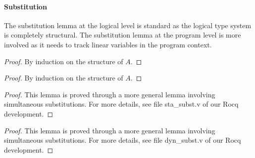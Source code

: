 \paragraph{\textbf{Substitution}}
The substitution lemma at the logical level is standard as the logical type system is
completely structural. The substitution lemma at the program level is more involved
as it needs to track linear variables in the program context.

\begin{proof}
  By induction on the structure of $A$.
\end{proof}

\begin{proof}
  By induction on the structure of $A$.
\end{proof}

\begin{proof}
  This lemma is proved through a more general lemma involving simultaneous substitutions. 
  For more details, see file \textsf{sta\_subst.v} of our Rocq development.
\end{proof}


\begin{proof}
  This lemma is proved through a more general lemma involving simultaneous substitutions. 
  For more details, see file \textsf{dyn\_subst.v} of our Rocq development.
\end{proof}

